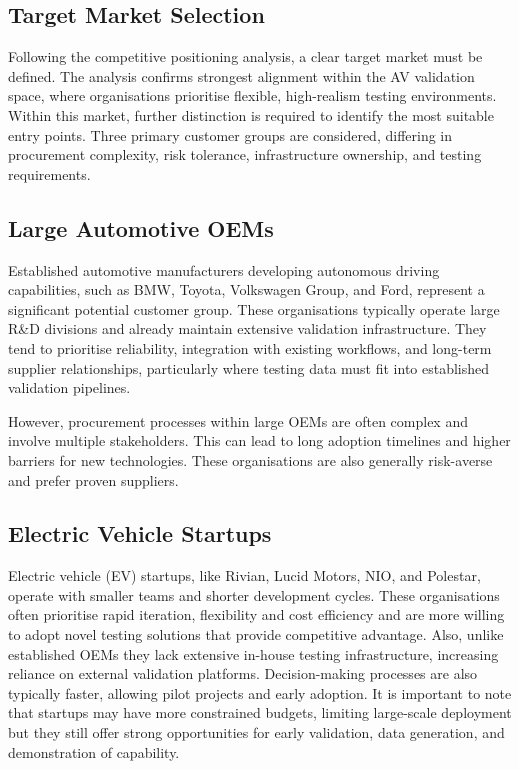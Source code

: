 \documentclass[11pt, a4paper]{report}
\numberwithin{equation}{section}
\begin{document}
\begin{refsection}

\section{Target Market Selection}
\label{sec:target_market_selection}

Following the competitive positioning analysis, a clear target market must be defined. The analysis confirms strongest alignment within the AV validation space, where organisations prioritise flexible, high-realism testing environments. Within this market, further distinction is required to identify the most suitable entry points. Three primary customer groups are considered, differing in procurement complexity, risk tolerance, infrastructure ownership, and testing requirements.

\subsection{Large Automotive OEMs}

Established automotive manufacturers developing autonomous driving capabilities, such as BMW, Toyota, Volkswagen Group, and Ford, represent a significant potential customer group. These organisations typically operate large R\&D divisions and already maintain extensive validation infrastructure. They tend to prioritise reliability, integration with existing workflows, and long-term supplier relationships, particularly where testing data must fit into established validation pipelines.

However, procurement processes within large OEMs are often complex and involve multiple stakeholders. This can lead to long adoption timelines and higher barriers for new technologies. These organisations are also generally risk-averse and prefer proven suppliers.

\subsection{Electric Vehicle Startups}

Electric vehicle (EV) startups, like Rivian, Lucid Motors, NIO, and Polestar, operate with smaller teams and shorter development cycles. These organisations often prioritise rapid iteration, flexibility and cost efficiency and are more willing to adopt novel testing solutions that provide competitive advantage. 
Also, unlike established OEMs they lack extensive in-house testing infrastructure, increasing reliance on external validation platforms. Decision-making processes are also typically faster, allowing pilot projects and early adoption.
It is important to note that startups may have more constrained budgets, limiting large-scale deployment but they still offer strong opportunities for early validation, data generation, and demonstration of capability.


\end{refsection}
\end{document}
